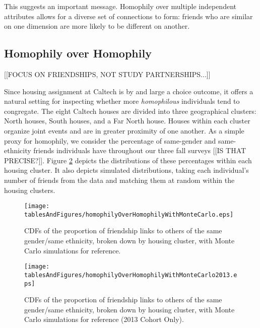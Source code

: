 \documentclass[12pt,letterpaper,english]{article}
\begin{document}
This suggests an important message. Homophily over multiple independent attributes allows for a diverse set of connections to form: friends who are similar on one dimension are more likely to be different on another. 



\subsection{Homophily over Homophily \label{sec:homophilyOverHomophily}}

[[FOCUS ON FRIENDSHIPS, NOT STUDY PARTNERSHIPS...]]

Since housing assignment at Caltech is by and large a choice outcome, it offers a natural setting for inspecting whether more \textit{homophilous} individuals tend to congregate. The eight Caltech houses are divided into three geographical clusters: North houses, South houses, and a Far North house. Houses within each cluster organize joint events and are in greater proximity of one another. As a simple proxy for homophily, we consider the percentage of same-gender and same-ethnicity friends individuals have throughout our three fall surveys [[IS THAT PRECISE?]]. Figure \ref{CDF_SG_SE_byCluster} depicts the distributions of these percentages within each housing cluster. It also depicts simulated distributions, taking each individual's number of friends from the data and matching them at random within the housing clusters.

\begin{figure}[t!]
\begin{center}
\caption{CDFs of the proportion of friendship links to others of the same gender/same ethnicity, broken down by housing cluster, with Monte Carlo simulations for reference. \label{CDF_SG_SE_byCluster}}
\texttt{[image: tablesAndFigures/homophilyOverHomophilyWithMonteCarlo.eps]}
\end{center}
\end{figure}

\begin{figure}[t!]
\begin{center}
\caption{CDFs of the proportion of friendship links to others of the same gender/same ethnicity, broken down by housing cluster, with Monte Carlo simulations for reference (2013 Cohort Only). \label{CDF_SG_SE_byCluster}}
\texttt{[image: tablesAndFigures/homophilyOverHomophilyWithMonteCarlo2013.eps]}
\end{center}
\end{figure}
\end{document}
